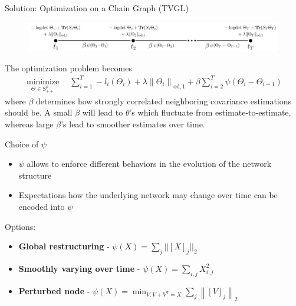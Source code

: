 \documentclass{beamer}
\begin{document}
\begin{frame}{Solution: Optimization on a Chain Graph (TVGL)}
    \begin{figure}
       \includegraphics[width=12cm]{chain_graph.png}
       \caption{\cite{hallac2017network}}
       \label{fig:chain_graph}
  \end{figure}
    The optimization problem becomes
    \begin{align*}
        \underset{\Theta \in \mathrm{S}_{++}^{p}}{\operatorname{minimize}} \quad \sum_{i=1}^{T}-l_{i}\left(\Theta_{i}\right)+\lambda\left\|\Theta_{i}\right\|_{\mathrm{od}, 1}+\beta \sum_{i=2}^{T} \psi\left(\Theta_{i}-\Theta_{i-1}\right)
    \end{align*}
    where $\beta$ determines how strongly correlated neighboring covariance estimations should be.
    A small $\beta$ will lead to $\theta$'s which fluctuate from estimate-to-estimate, whereas large $\beta$'s lead to smoother estimates over time.
\end{frame}

\begin{frame}{Choice of $\psi$}
    \begin{itemize}
        \item $\psi$ allows to enforce different behaviors in the evolution of the network structure
        \item Expectations how the underlying network may change over time can be encoded into $\psi$
    \end{itemize}
    Options:
    \begin{itemize}
        \item \textbf{Global restructuring} - $\psi(X) = \sum_j||[X]_j||_2$
        \item \textbf{Smoothly varying over time} - $\psi(X) = \sum_{i,j}X^2_{i,j}$
        \item \textbf{Perturbed node} - $\psi(X)=\min _{V: V+V^{T}=X} \sum_{j}\left\|[V]_{j}\right\|_{2}$
    \end{itemize}
\end{frame}
\end{document}
